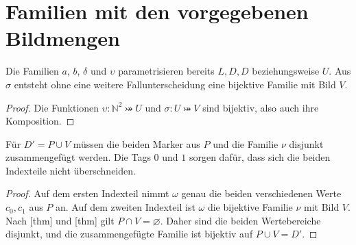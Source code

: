 \documentclass[main.tex]{subfiles}
\begin{document}
\section{Familien mit den vorgegebenen Bildmengen}

Die Familien \(a\), \(b\), \(\delta\) und \(\upsilon\) parametrisieren
bereits \(L,D,D\) beziehungsweise \(U\). Aus \(\sigma\) entsteht ohne eine
weitere Fallunterscheidung eine bijektive Familie mit Bild \(V\).


\begin{proof}
Die Funktionen \(\upsilon\colon\mathbb N^2\bij U\) und
\(\sigma\colon U\bij V\) sind bijektiv, also auch ihre Komposition.
\end{proof}

Für \(D'=P\cup V\) müssen die beiden Marker aus \(P\) und die Familie
\(\nu\) disjunkt zusammengefügt werden. Die Tags \(0\) und \(1\) sorgen
dafür, dass sich die beiden Indexteile nicht überschneiden.



\begin{proof}
Auf dem ersten Indexteil nimmt \(\omega\) genau die beiden verschiedenen
Werte \(c_0,c_1\) aus \(P\) an. Auf dem zweiten Indexteil ist \(\omega\)
die bijektive Familie \(\nu\) mit Bild \(V\). Nach
[thm] und
[thm] gilt
\(P\cap V=\varnothing\). Daher sind die beiden Wertebereiche disjunkt, und
die zusammengefügte Familie ist bijektiv auf \(P\cup V=D'\).
\end{proof}
\end{document}
